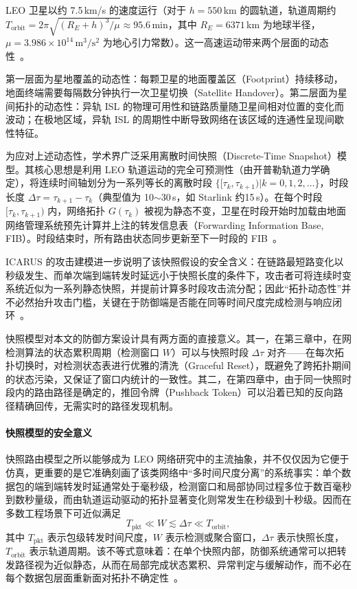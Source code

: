 LEO 卫星以约 7.5\,km/s 的速度运行（对于 $h=550$\,km 的圆轨道，轨道周期约 $T_{\text{orbit}} = 2\pi\sqrt{(R_E+h)^3/\mu} \approx 95.6$\,min，其中 $R_E = 6371$\,km 为地球半径，$\mu = 3.986 \times 10^{14}\,\text{m}^3/\text{s}^2$ 为地心引力常数）。这一高速运动带来两个层面的动态性~\cite{kodheli2021satellite}。

第一层面为星地覆盖的动态性：每颗卫星的地面覆盖区（Footprint）持续移动，地面终端需要每隔数分钟执行一次卫星切换（Satellite Handover）。第二层面为星间拓扑的动态性：异轨 ISL 的物理可用性和链路质量随卫星间相对位置的变化而波动；在极地区域，异轨 ISL 的周期性中断导致网络在该区域的连通性呈现间歇性特征。

为应对上述动态性，学术界广泛采用离散时间快照（Discrete-Time Snapshot）模型。其核心思想是利用 LEO 轨道运动的完全可预测性（由开普勒轨道力学确定），将连续时间轴划分为一系列等长的离散时段 $\{[\tau_k, \tau_{k+1}) | k=0,1,2,\ldots\}$，时段长度 $\Delta\tau = \tau_{k+1} - \tau_k$（典型值为 10$\sim$30\,s，如 Starlink 约15\,s）。在每个时段 $[\tau_k, \tau_{k+1})$ 内，网络拓扑 $G(\tau_k)$ 被视为静态不变，卫星在时段开始时加载由地面网络管理系统预先计算并上注的转发信息表（Forwarding Information Base, FIB）。时段结束时，所有路由状态同步更新至下一时段的 FIB~\cite{handley2019delay, hypatia}。

ICARUS 的攻击建模进一步说明了该快照假设的安全含义：在链路最短路变化以秒级发生、而单次端到端转发时延远小于快照长度的条件下，攻击者可将连续时变系统近似为一系列静态快照，并提前计算多时段攻击流分配；因此“拓扑动态性”并不必然抬升攻击门槛，关键在于防御端是否能在同等时间尺度完成检测与响应闭环~\cite{icarus}。

快照模型对本文的防御方案设计具有两方面的直接意义。其一，在第三章中，在网检测算法的状态累积周期（检测窗口 $W$）可以与快照时段 $\Delta\tau$ 对齐——在每次拓扑切换时，对检测状态表进行优雅的清洗（Graceful Reset），既避免了跨拓扑期间的状态污染，又保证了窗口内统计的一致性。其二，在第四章中，由于同一快照时段内的路由路径是确定的，推回令牌（Pushback Token）可以沿着已知的反向路径精确回传，无需实时的路径发现机制。


\paragraph{快照模型的安全意义}
快照路由模型之所以能够成为 LEO 网络研究中的主流抽象，并不仅仅因为它便于仿真，更重要的是它准确刻画了该类网络中“多时间尺度分离”的系统事实：单个数据包的端到端转发时延通常处于毫秒级，检测窗口和局部协同过程多位于数百毫秒到数秒量级，而由轨道运动驱动的拓扑显著变化则常发生在秒级到十秒级。因而在多数工程场景下可近似满足
\begin{equation}
    T_{\mathrm{pkt}} \ll W \lesssim \Delta\tau \ll T_{\mathrm{orbit}},
\end{equation}
其中 $T_{\mathrm{pkt}}$ 表示包级转发时间尺度，$W$ 表示检测或聚合窗口，$\Delta\tau$ 表示快照长度，$T_{\mathrm{orbit}}$ 表示轨道周期。该不等式意味着：在单个快照内部，防御系统通常可以把转发路径视为近似静态，从而在局部完成状态累积、异常判定与缓解动作，而不必在每个数据包层面重新面对拓扑不确定性~\cite{hypatia, handley2019delay, icarus}。

